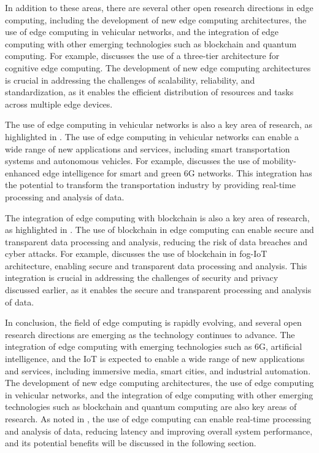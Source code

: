 \documentclass[11pt]{article}
\begin{document}
In addition to these areas, there are several other open research directions in edge computing, including the development of new edge computing architectures, the use of edge computing in vehicular networks, and the integration of edge computing with other emerging technologies such as blockchain and quantum computing. For example, \cite{ref210} discusses the use of a three-tier architecture for cognitive edge computing. The development of new edge computing architectures is crucial in addressing the challenges of scalability, reliability, and standardization, as it enables the efficient distribution of resources and tasks across multiple edge devices.

The use of edge computing in vehicular networks is also a key area of research, as highlighted in \cite{ref211}. The use of edge computing in vehicular networks can enable a wide range of new applications and services, including smart transportation systems and autonomous vehicles. For example, \cite{ref212} discusses the use of mobility-enhanced edge intelligence for smart and green 6G networks. This integration has the potential to transform the transportation industry by providing real-time processing and analysis of data.

The integration of edge computing with blockchain is also a key area of research, as highlighted in \cite{ref209}. The use of blockchain in edge computing can enable secure and transparent data processing and analysis, reducing the risk of data breaches and cyber attacks. For example, \cite{ref213} discusses the use of blockchain in fog-IoT architecture, enabling secure and transparent data processing and analysis. This integration is crucial in addressing the challenges of security and privacy discussed earlier, as it enables the secure and transparent processing and analysis of data.

In conclusion, the field of edge computing is rapidly evolving, and several open research directions are emerging as the technology continues to advance. The integration of edge computing with emerging technologies such as 6G, artificial intelligence, and the IoT is expected to enable a wide range of new applications and services, including immersive media, smart cities, and industrial automation. The development of new edge computing architectures, the use of edge computing in vehicular networks, and the integration of edge computing with other emerging technologies such as blockchain and quantum computing are also key areas of research. As noted in \cite{ref214}, the use of edge computing can enable real-time processing and analysis of data, reducing latency and improving overall system performance, and its potential benefits will be discussed in the following section.
\end{document}
